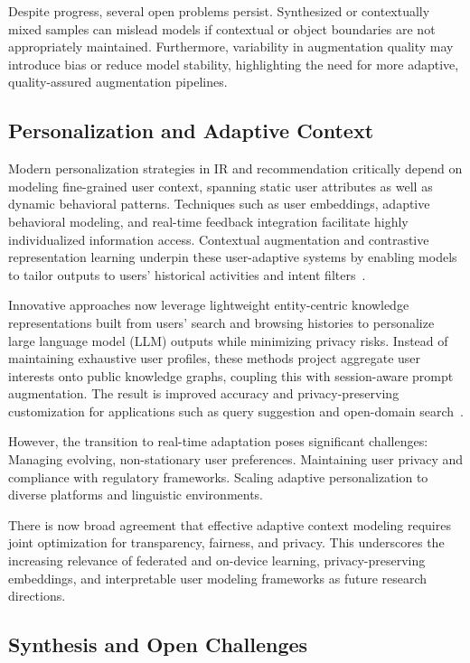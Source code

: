 \documentclass[sigconf]{acmart}
\begin{document}
Despite progress, several open problems persist. Synthesized or contextually mixed samples can mislead models if contextual or object boundaries are not appropriately maintained. Furthermore, variability in augmentation quality may introduce bias or reduce model stability, highlighting the need for more adaptive, quality-assured augmentation pipelines.

\subsection{Personalization and Adaptive Context}

Modern personalization strategies in IR and recommendation critically depend on modeling fine-grained user context, spanning static user attributes as well as dynamic behavioral patterns. Techniques such as user embeddings, adaptive behavioral modeling, and real-time feedback integration facilitate highly individualized information access. Contextual augmentation and contrastive representation learning underpin these user-adaptive systems by enabling models to tailor outputs to users' historical activities and intent filters~\cite{ref36, ref52, ref55, ref61}.

Innovative approaches now leverage lightweight entity-centric knowledge representations built from users' search and browsing histories to personalize large language model (LLM) outputs while minimizing privacy risks. Instead of maintaining exhaustive user profiles, these methods project aggregate user interests onto public knowledge graphs, coupling this with session-aware prompt augmentation. The result is improved accuracy and privacy-preserving customization for applications such as query suggestion and open-domain search~\cite{ref52}.

However, the transition to real-time adaptation poses significant challenges:
Managing evolving, non-stationary user preferences.
Maintaining user privacy and compliance with regulatory frameworks.
Scaling adaptive personalization to diverse platforms and linguistic environments.

There is now broad agreement that effective adaptive context modeling requires joint optimization for transparency, fairness, and privacy. This underscores the increasing relevance of federated and on-device learning, privacy-preserving embeddings, and interpretable user modeling frameworks as future research directions.

\subsection{Synthesis and Open Challenges}
\end{document}
